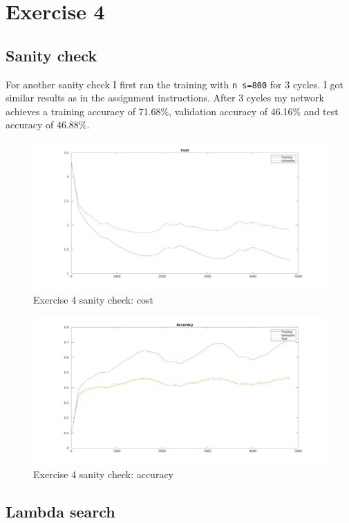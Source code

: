 \section{Exercise 4}
\subsection{Sanity check}
For another sanity check I first ran the training with \texttt{n s=800} for 3 cycles. I got similar results as in the assignment instructions.
After 3 cycles my network achieves a training accuracy of 71.68\%, validation accuracy of 46.16\% and test accuracy of 46.88\%.
    \begin{figure}[ht]
        \includegraphics[width=\textwidth]{../code/result_pics/ex4_cost.png}
        \caption{Exercise 4 sanity check: cost}
    \end{figure}
    \begin{figure}[ht]
        \includegraphics[width=\textwidth]{../code/result_pics/ex4_accuracy.png}
        \caption{Exercise 4 sanity check: accuracy}
    \end{figure}
\clearpage

\subsection{Lambda search}
